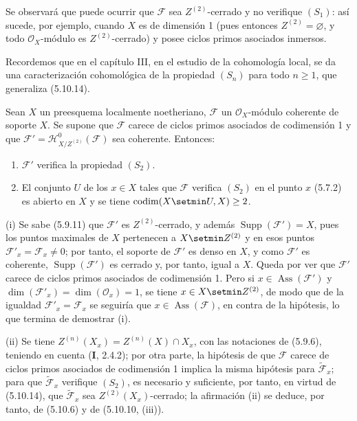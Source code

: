 Se observará que puede ocurrir que $\mathcal F$ sea $Z^{(2)}$-cerrado y no
verifique $(S_1)$: así sucede, por ejemplo, cuando $X$ es de dimensión 1
(pues entonces $Z^{(2)}=\varnothing$, y todo $\mathcal O_X$-módulo es
$Z^{(2)}$-cerrado) y posee ciclos primos asociados inmersos.

Recordemos que en el capítulo III, en el estudio de la cohomología local, se
da una caracterización cohomológica de la propiedad $(S_n)$ para todo
$n\geq1$, que generaliza (5.10.14).

\begin{corollary}[5.10.15]
\label{IV.2.s5.10.15-fr}
Sean $X$ un preesquema localmente noetheriano, $\mathcal F$ un
$\mathcal O_X$-módulo coherente de soporte $X$. Se supone que $\mathcal F$
carece de ciclos primos asociados de codimensión 1 y que
$\mathcal F'=\mathcal H^0_{X/Z^{(2)}}(\mathcal F)$ sea coherente. Entonces:
\begin{enumerate}
\item[\textup{(i)}] $\mathcal F'$ verifica la propiedad $(S_2)$.


\item[\textup{(ii)}] El conjunto $U$ de los $x\in X$ tales que $\mathcal F$ verifica
$(S_2)$ en el punto $x$ \textup{(5.7.2)} es abierto en $X$ y se tiene
$\operatorname{codim}(X\setmin U,X)\geq2$.
\end{enumerate}
\end{corollary}

(i) Se sabe (5.9.11) que $\mathcal F'$ es $Z^{(2)}$-cerrado, y además
$\operatorname{Supp}(\mathcal F')=X$, pues los puntos maximales de $X$
pertenecen a $X\setmin Z^{(2)}$ y en esos puntos
$\mathcal F'_x=\mathcal F_x\neq0$; por tanto, el soporte de $\mathcal F'$ es
denso en $X$, y como $\mathcal F'$ es coherente,
$\operatorname{Supp}(\mathcal F')$ es cerrado y, por tanto, igual a $X$. Queda
por ver que $\mathcal F'$ carece de ciclos primos asociados de codimensión 1.
Pero si $x\in\operatorname{Ass}(\mathcal F')$ y
$\dim(\mathcal F'_x)=\dim(\mathcal O_x)=1$, se tiene $x\in X\setmin Z^{(2)}$, de
modo que de la igualdad $\mathcal F'_x=\mathcal F_x$ se seguiría que
$x\in\operatorname{Ass}(\mathcal F)$, en contra de la hipótesis, lo que
termina de demostrar (i).

(ii) Se tiene $Z^{(n)}(X_x)=Z^{(n)}(X)\cap X_x$, con las notaciones de
(5.9.6), teniendo en cuenta (\textbf I, 2.4.2); por otra parte, la hipótesis de que
$\mathcal F$ carece de ciclos primos asociados de codimensión 1 implica la
misma hipótesis para $\widetilde{\mathcal F}_x$; para que
$\widetilde{\mathcal F}_x$ verifique $(S_2)$, es necesario y suficiente, por
tanto, en virtud de (5.10.14), que $\widetilde{\mathcal F}_x$ sea
$Z^{(2)}(X_x)$-cerrado; la afirmación (ii) se deduce, por tanto, de (5.10.6) y
de (5.10.10, (iii)).

